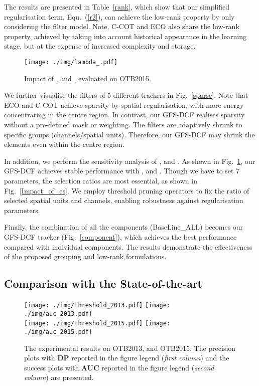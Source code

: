 \documentclass[10pt,twocolumn,letterpaper]{article}
\begin{document}
The results are presented in Table~\ref{rank}, which show that our simplified regularisation term, Equ.~(\ref{r2}), can achieve the low-rank property by only considering the filter model. 
Note, C-COT and ECO also share the low-rank property, achieved by taking into account historical appearance in the learning stage, but at the expense of increased complexity and storage.
\begin{figure}[!t]
\begin{center}
\texttt{[image: ./img/lambda\_.pdf]}
\end{center}
\vspace{-0.4cm}
\caption{Impact of ,  and , evaluated on OTB2015.}
\label{lambda}
\end{figure}

We further visualise the filters of 5 different trackers in Fig.~\ref{sparse}. Note that ECO and C-COT achieve sparsity by spatial regularisation, with more energy concentrating in the centre region. In contrast, our GFS-DCF realises sparsity without a pre-defined mask or weighting. The filters are adaptively shrunk to specific groups (channels/spatial units). Therefore, our GFS-DCF may shrink the elements even within the centre region.

In addition, we perform the sensitivity analysis of ,  and . 
As shown in Fig.~\ref{lambda}, our GFS-DCF achieves stable performance with ,  and .
Though we have to set 7 parameters, the selection ratios are most essential, as shown in Fig.~\ref{Impact_of_cs}.
We employ threshold pruning operators to fix the ratio of selected spatial units and channels, enabling robustness against regularisation parameters.

Finally, the combination of all the components (BaseLine\_ALL) becomes our GFS-DCF tracker (Fig.~\ref{component}), which achieves the best performance compared with individual components.
The results demonstrate the effectiveness of the proposed grouping and low-rank formulations.

\subsection{Comparison with the State-of-the-art}
\begin{figure}[t]
\begin{center}
 \texttt{[image: ./img/threshold\_2013.pdf]}
 \texttt{[image: ./img/auc\_2013.pdf]}
 \\
 \texttt{[image: ./img/threshold\_2015.pdf]}
 \texttt{[image: ./img/auc\_2015.pdf]}
 \\
\end{center}
   \caption{The experimental results on OTB2013, and OTB2015. The precision plots with \textbf{DP} reported in the figure legend (\textit{first column}) and the success plots with \textbf{AUC} reported in the figure legend (\textit{second column}) are presented. }\label{otb100}
\end{figure}
\end{document}
